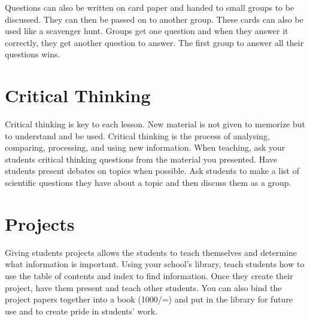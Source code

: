 Questions can also be written on card paper and handed to small groups to be discussed. They can then be passed on to another group.  These cards can also be used like a scavenger hunt.  Groups get one question and when they answer it correctly, they get another question to answer.  The first group to answer all their questions wins.

\section{Critical Thinking}
Critical thinking is key to each lesson.  New material is not given to memorize but to understand and be used. Critical thinking is the process of analysing, comparing, processing, and using new information. When teaching, ask your students critical thinking questions from the material you presented.  Have students present debates on topics when possible.  Ask students to make a list of scientific questions they have about a topic and then discuss them as a group.

\section{Projects}
Giving students projects allows the students to teach themselves and determine what information is important. Using your school's library, teach students how to use the table of contents and index to find information. Once they create their project, have them present and teach other students. You can also bind the project papers together into a book (1000/=) and put in the library for future use and to create pride in students' work.
